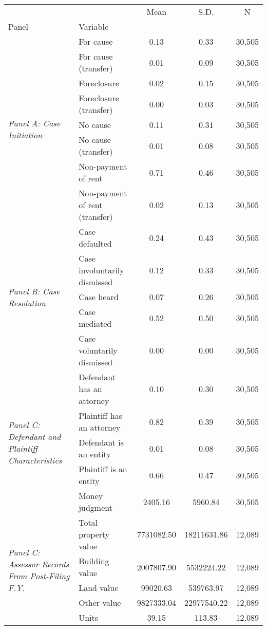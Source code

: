 \begin{table}[H]
\begin{tabular}{llccc}
\toprule
 &  & Mean & S.D. & N \\
Panel & Variable &  &  &  \\
\midrule
\multirow[c]{8}{4cm}{\textit{Panel A: Case Initiation}} & For cause & 0.13 & 0.33 & 30,505 \\
 & For cause (transfer) & 0.01 & 0.09 & 30,505 \\
 & Foreclosure & 0.02 & 0.15 & 30,505 \\
 & Foreclosure (transfer) & 0.00 & 0.03 & 30,505 \\
 & No cause & 0.11 & 0.31 & 30,505 \\
 & No cause (transfer) & 0.01 & 0.08 & 30,505 \\
 & Non-payment of rent & 0.71 & 0.46 & 30,505 \\
 & Non-payment of rent (transfer) & 0.02 & 0.13 & 30,505 \\
\cline{1-5}
\multirow[c]{5}{4cm}{\textit{Panel B: Case Resolution}} & Case defaulted & 0.24 & 0.43 & 30,505 \\
 & Case involuntarily dismissed & 0.12 & 0.33 & 30,505 \\
 & Case heard & 0.07 & 0.26 & 30,505 \\
 & Case mediated & 0.52 & 0.50 & 30,505 \\
 & Case voluntarily dismissed & 0.00 & 0.00 & 30,505 \\
\cline{1-5}
\multirow[c]{5}{4cm}{\textit{Panel C: Defendant and Plaintiff Characteristics}} & Defendant has an attorney & 0.10 & 0.30 & 30,505 \\
 & Plaintiff has an attorney & 0.82 & 0.39 & 30,505 \\
 & Defendant is an entity & 0.01 & 0.08 & 30,505 \\
 & Plaintiff is an entity & 0.66 & 0.47 & 30,505 \\
 & Money judgment & 2405.16 & 5960.84 & 30,505 \\
\cline{1-5}
\multirow[c]{5}{4cm}{\textit{Panel C: Assessor Records From Post-Filing F.Y.}} & Total property value & 7731082.50 & 18211631.86 & 12,089 \\
 & Building value & 2007807.90 & 5532224.22 & 12,089 \\
 & Land value & 99020.63 & 539763.97 & 12,089 \\
 & Other value & 9827333.04 & 22977540.22 & 12,089 \\
 & Units & 39.15 & 113.83 & 12,089 \\

\end{tabular}
\end{table}
